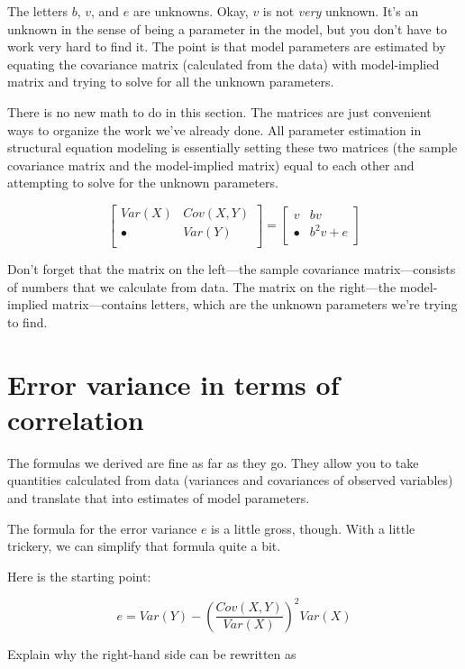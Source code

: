 \documentclass[
]{book}
\begin{document}
The letters \(b\), \(v\), and \(e\) are unknowns. Okay, \(v\) is not \emph{very} unknown. It's an unknown in the sense of being a parameter in the model, but you don't have to work very hard to find it. The point is that model parameters are estimated by equating the covariance matrix (calculated from the data) with model-implied matrix and trying to solve for all the unknown parameters.

There is no new math to do in this section. The matrices are just convenient ways to organize the work we've already done. All parameter estimation in structural equation modeling is essentially setting these two matrices (the sample covariance matrix and the model-implied matrix) equal to each other and attempting to solve for the unknown parameters.

\[
\begin{bmatrix}
Var(X)       &    Cov(X, Y) \\
\bullet      &    Var(Y)    \\
\end{bmatrix} =
\begin{bmatrix}
v         &    bv         \\
\bullet   &    b^{2}v + e \\
\end{bmatrix}
\]

Don't forget that the matrix on the left---the sample covariance matrix---consists of numbers that we calculate from data. The matrix on the right---the model-implied matrix---contains letters, which are the unknown parameters we're trying to find.

\hypertarget{simple-error-correlation}{%
\section{Error variance in terms of correlation}\label{simple-error-correlation}}

The formulas we derived are fine as far as they go. They allow you to take quantities calculated from data (variances and covariances of observed variables) and translate that into estimates of model parameters.

The formula for the error variance \(e\) is a little gross, though. With a little trickery, we can simplify that formula quite a bit.

Here is the starting point:

\[
e = Var(Y) - \left( \frac{Cov(X, Y)}{Var(X)} \right)^2 Var(X)
\]

Explain why the right-hand side can be rewritten as
\end{document}
